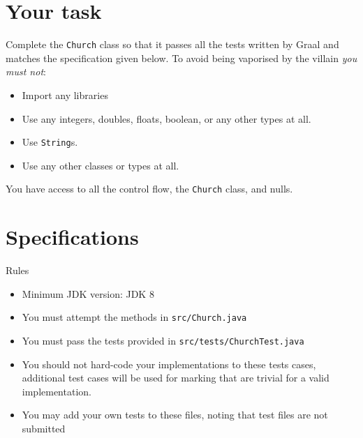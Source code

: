 \documentclass[twoside=false,DIV=14]{scrartcl}
\begin{document}
\section{Your task}
Complete the \lstinline{Church} class so that it passes all the tests written by Graal and matches the specification given below.  To avoid being vaporised by the villain \emph{you must not}:
\begin{itemize}
\item Import any libraries
\item Use any integers, doubles, floats, boolean, or any other types at all.
\item Use \verb+String+s.
\item Use any other classes or types at all.
\end{itemize}
You have access to all the control flow, the \lstinline{Church} class, and nulls.

\section{Specifications}

Rules
\begin{itemize}
 \item Minimum JDK version: JDK 8
 \item You must attempt the methods in \lstinline{src/Church.java}
 \item You must pass the tests provided in \lstinline{src/tests/ChurchTest.java}
 \item You should not hard-code your implementations to these tests cases,
additional test cases will be used for marking that are trivial for a
valid implementation.
 \item You may add your own tests to these files, noting that test files are
not submitted
\end{itemize}
\end{document}
